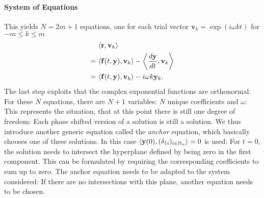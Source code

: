 \paragraph{System of Equations} This yields $N = 2m+1$ equations, one for each trial vector $\mathbf{v}_k = \exp\left( i \omega k t \right)$ for $-m \le k \le m$
	\begin{align}
		& \langle \mathbf{r} , \mathbf{v}_k \rangle \nonumber \\
		=\ & \langle \mathbf{f}(t,\mathbf{y}), \mathbf{v}_k \rangle - \left\langle \frac{d\mathbf{y}}{dt}, \mathbf{v}_k \right\rangle \nonumber \\
		=\ & \langle \mathbf{f}(t,\mathbf{y}), \mathbf{v}_k \rangle - i \omega k \mathbf{y}_k \label{eq:innerprod} \text.
	\end{align}
The last step exploits that the complex exponential functions are orthonormal.
For these $N$ equations, there are $N+1$ variables: $N$ unique coefficients and $\omega$.
This represents the situation, that at this point there is still one degree of freedom: Each phase shifted version of a solution is still a solution.
We thus introduce another generic equation called the \emph{anchor} equation, which basically chooses one of these solutions.
In this case $\langle \mathbf{y}(0), (\delta_{1i})_{i \in \mathbb{N}_n} \rangle = 0$ is used:
For $t = 0$, the solution needs to intersect the hyperplane defined by being zero in the first component.
This can be formulated by requiring the corresponding coefficients to sum up to zero.
The anchor equation needs to be adapted to the system considered: If there are no intersections with this plane, another equation needs to be chosen.

